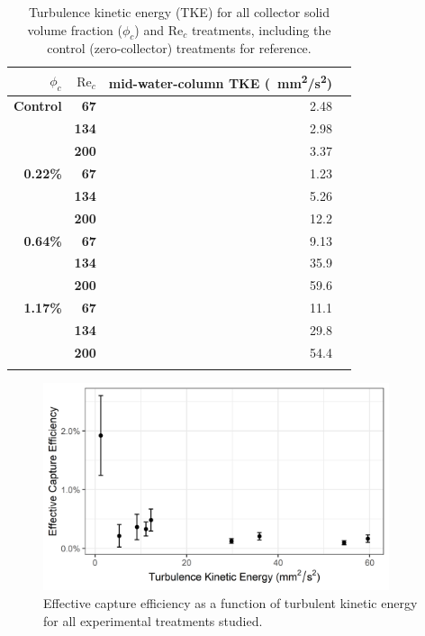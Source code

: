 \documentclass[geosciences,article,submit,moreauthors,pdftex]{Definitions/mdpi}
\newcommand\Rey{\mathrm{Re}}
\begin{document}
\begin{table}[H]
\caption{Turbulence kinetic energy (TKE) for all collector solid volume fraction ($\phi_c$) and $\Rey_c$ treatments, including the control (zero-collector) treatments for reference.}
\centering
\begin{tabular}{>{\bfseries}r>{\bfseries}rrr}
\toprule
\textbf{$\phi_c$}&\textbf{$\Rey_c$}&\textbf{mid-water-column TKE (\SI{}{\milli\metre^2/\second^2})}\\
\midrule
Control &   67  & \num{2.48}\\
        &   134 & \num{2.98}\\
        &   200 & \num{3.37}\\
\midrule
0.22\% &   67  & \num{1.23}\\
        &   134 & \num{5.26}\\
        &   200 & \num{12.2}\\
\midrule
0.64\% &   67  & \num{9.13}\\
        &   134 & \num{35.9}\\
        &   200 & \num{59.6}\\
\midrule
1.17\%  &   67  & \num{11.1}\\
        &   134 & \num{29.8}\\
        &   200 & \num{54.4}\\
\bottomrule
\label{tbl:turbulence}
\end{tabular}
\end{table}

\begin{figure}[ht]
\centering
\includegraphics[width=4in]{../pics/tke.png}
\caption{Effective capture efficiency as a function of turbulent kinetic energy for all experimental treatments studied.}
\label{fig:tke}
\end{figure}   
\end{document}
